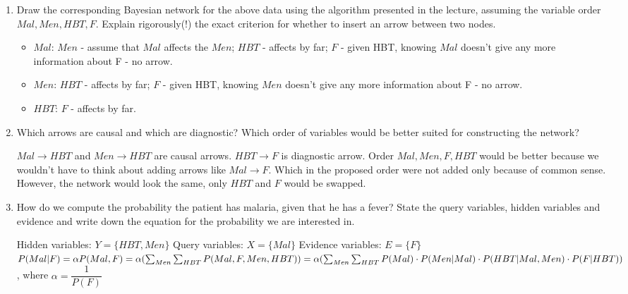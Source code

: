 \documentclass{homework}
\begin{document}
\begin{enumerate}
	\item Draw the corresponding Bayesian network for the above data using the algorithm presented in the lecture, assuming the variable order $Mal,Men,HBT,F.$ Explain rigorously(!) the exact criterion for whether to insert an arrow between two nodes.
		\begin{center}
		\end{center}
	\begin{itemize}
		\item $Mal$: $Men$ - assume that $Mal$ affects the $Men$; $HBT$ - affects by far; $F$ - given HBT, knowing $Mal$ doesn’t give any more information about F - no arrow.
		\item $Men$: $HBT$ - affects by far; $F$ - given HBT, knowing $Men$ doesn’t give any more information about F - no arrow.
		\item $HBT$: $F$ -  affects by far.
	\end{itemize}
	\item Which arrows are causal and which are diagnostic? Which order of variables would be better suited for constructing the network?
	
	$Mal \rightarrow HBT$ and $Men \rightarrow HBT$ are causal arrows. $HBT \rightarrow F$ is diagnostic arrow. Order $Mal, Men, F, HBT$ would be better because we wouldn't have to think about adding arrows like $Mal \rightarrow F$. Which in the proposed order were not added only because of common sense. However, the network would look the same, only $HBT$ and $F$ would be swapped.
	\item How do we compute the probability the patient has malaria, given that he has a fever? State the query variables, hidden variables and evidence and write down the equation for the probability we are interested in.
	
	Hidden variables: $Y = \{HBT, Men\}$\newline
	Query variables: $X = \{Mal\}$\newline
	Evidence variables: $E = \{F\}$\newline
	$ P(Mal|F) = \alpha P(Mal, F) = \alpha(\sum_{Men}\sum_{HBT} P(Mal, F, Men,HBT)) = \newline \alpha(\sum_{Men}\sum_{HBT} P(Mal)\cdot P(Men|Mal)\cdot P(HBT|Mal,Men)\cdot P(F|HBT))$, \newline where
	$\alpha = \dfrac{1}{P(F)}$
\end{enumerate}
\end{document}
